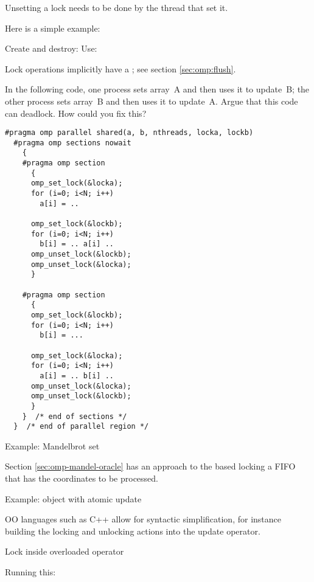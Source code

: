 Unsetting a lock needs to be done by the thread that set it.

Here is a simple example:
\begin{multicols}{2}
Create and destroy:
\columnbreak
Use:
\end{multicols}

Lock operations implicitly have a ;
see section \ref{sec:omp:flush}.

\begin{exercise}
  \label{ex:loc-deadlock}
  In the following code, one process sets array~A and then uses it to
  update~B; the other process sets array~B and then uses it to
  update~A.
  Argue that this code can deadlock. How could you fix this?
\begin{lstlisting}[language=omp]
#pragma omp parallel shared(a, b, nthreads, locka, lockb)
  #pragma omp sections nowait
    {
    #pragma omp section
      {
      omp_set_lock(&locka);
      for (i=0; i<N; i++)
        a[i] = ..

      omp_set_lock(&lockb);
      for (i=0; i<N; i++)
        b[i] = .. a[i] ..
      omp_unset_lock(&lockb);
      omp_unset_lock(&locka);
      }

    #pragma omp section
      {
      omp_set_lock(&lockb);
      for (i=0; i<N; i++)
        b[i] = ...

      omp_set_lock(&locka);
      for (i=0; i<N; i++)
        a[i] = .. b[i] ..
      omp_unset_lock(&locka);
      omp_unset_lock(&lockb);
      }
    }  /* end of sections */
  }  /* end of parallel region */
\end{lstlisting}
\end{exercise}

 {Example: Mandelbrot set}

Section \ref{sec:omp-mandel-oracle} has an approach to the  
based locking a FIFO that has the coordinates to be processed.

 {Example: object with atomic update}

\ac{OO} languages such as C++ allow for syntactic simplification,
for instance building the locking and unlocking actions into
the update operator.

\begin{cppnote}{Lock inside overloaded operator}
  \label{cpp:op-lock}

  Running this:

\end{cppnote}

